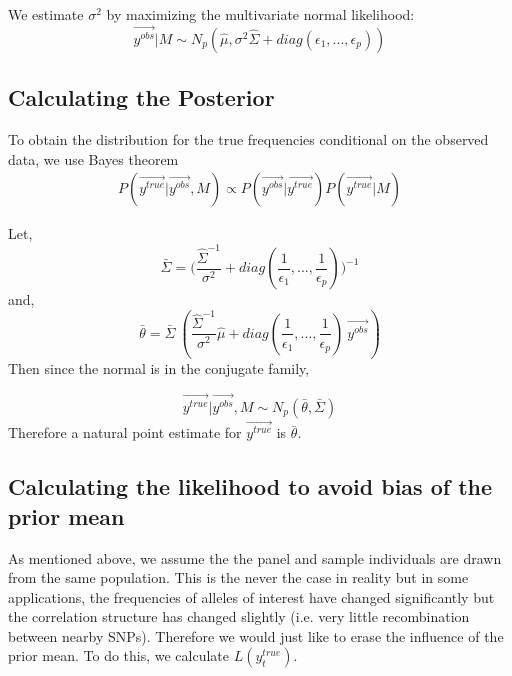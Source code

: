 \documentclass[10pt,a4paper,draft]{article}
\begin{document}
We estimate $\sigma^2$ by maximizing the multivariate normal likelihood:
\begin{equation}
 \vec{y^{obs}}|M \sim N_p(\hat{\mu}, \sigma^2\hat{\Sigma} + diag(\epsilon_1,...,\epsilon_p))
\end{equation}


\subsection{Calculating the Posterior}
To obtain the distribution for the true frequencies conditional on the observed data, we use Bayes theorem 
\begin{align*}
P(\vec{y^{true}} | \vec{y^{obs}}, M) \propto P(\vec{y^{obs}} | \vec{y^{true}}) P(\vec{y^{true}}|M)
\end{align*}

Let, 
\begin{equation} \label{barsigma}
\bar{\Sigma} = \big(\frac{\hat{\Sigma}^{-1}}{\sigma^2} + diag(\frac{1}{\epsilon_1},..., \frac{1}{\epsilon_p})\big)^{-1}
\end{equation}
and,
\begin{equation}
\bar{\theta} = \bar{\Sigma} \ (\frac{\hat{\Sigma}^{-1}}{\sigma^2}\hat{\mu} + diag(\frac{1}{\epsilon_1},..., \frac{1}{\epsilon_p}) \ \vec{y^{obs}})
\end{equation}
Then since the normal is in the conjugate family,

\begin{equation}
\vec{y^{true}} | \vec{y^{obs}}, M \sim N_p(\bar{\theta}, \bar{\Sigma})
\end{equation}
Therefore a natural point estimate for $\vec{y^{true}}$ is $\bar{\theta}$.


\subsection{Calculating the likelihood to avoid bias of the prior mean}
As mentioned above, we assume the the panel and sample individuals are drawn from the same population. This is the never the case in reality but in some applications, the frequencies of alleles of interest have changed significantly but the correlation structure has changed slightly (i.e. very little recombination between nearby SNPs). Therefore we would just like to erase the influence of the prior mean. To do this, we calculate $L(y_t^{true})$. \\
\end{document}

